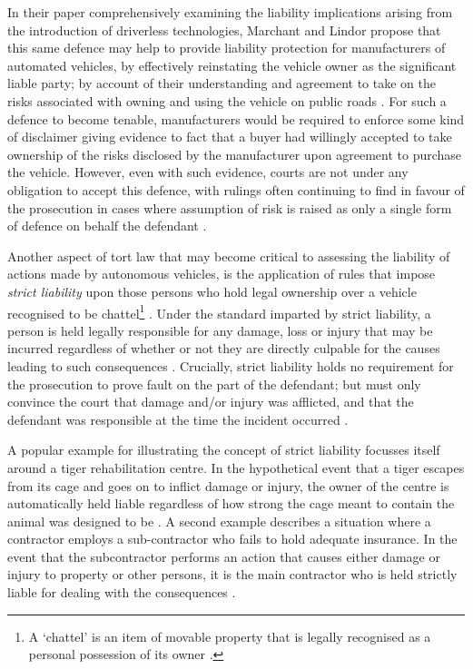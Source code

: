 \documentclass[conference]{IEEEtran}
\begin{document}
 In their paper comprehensively examining the liability implications arising from the introduction of driverless technologies, Marchant and Lindor propose that this same defence may help to provide liability protection for manufacturers of automated vehicles, by effectively reinstating the vehicle owner as the significant liable party; by account of their understanding and agreement to take on the risks associated with owning and using the vehicle on public roads \cite{marchant}. For such a defence to become tenable, manufacturers would be required to enforce some kind of disclaimer giving evidence to fact that a buyer had willingly accepted to take ownership of the risks disclosed by the manufacturer upon agreement to purchase the vehicle. However, even with such evidence, courts are not under any obligation to accept this defence, with rulings often continuing to find in favour of the prosecution in cases where assumption of risk is raised as only a single form of defence on behalf the defendant \cite{marchant}. 
 
Another aspect of tort law that may become critical to assessing the liability of  actions made by autonomous vehicles, is the application of rules that impose \textit{strict liability} upon those persons who hold legal ownership over a vehicle recognised to be chattel\footnote{A `chattel' is an item of movable property that is legally recognised as a personal possession of its owner \cite{chattel}.} \cite{duffy}. Under the standard imparted by strict liability, a person is held legally responsible for any damage, loss or injury that may be incurred regardless of whether or not they are directly culpable for the causes leading to such consequences \cite{intro-financial-planning}. Crucially, strict liability holds no requirement for the prosecution to prove fault on the part of the defendant; but must only convince the court that damage and/or injury was afflicted, and that the defendant was responsible at the time the incident occurred \cite{cantu}. 

A popular example for illustrating the concept of strict liability focusses itself around a tiger rehabilitation centre. In the hypothetical event that a tiger escapes from its cage and goes on to inflict damage or injury, the owner of the centre is automatically held liable regardless of how strong the cage meant to contain the animal was designed to be \cite{intro-financial-planning}. A second example describes a situation where a contractor employs a sub-contractor who fails to hold adequate insurance. In the event that the subcontractor performs an action that causes either damage or injury to property or other persons, it is the main contractor who is held strictly liable for dealing with the consequences \cite{intro-financial-planning}. 
\end{document}

